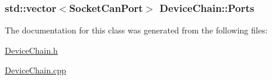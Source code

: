 \subsubsection[{\texorpdfstring{Ports}{Ports}}]{\setlength{\rightskip}{0pt plus 5cm}std\+::vector$<${\bf Socket\+Can\+Port}$>$ Device\+Chain\+::\+Ports\hspace{0.3cm}{\ttfamily [private]}}\hypertarget{classDeviceChain_a760e12bf0095431fe76563cc5d7969de}{}\label{classDeviceChain_a760e12bf0095431fe76563cc5d7969de}


The documentation for this class was generated from the following files\+:\begin{DoxyCompactItemize}
\item 
\hyperlink{DeviceChain_8h}{Device\+Chain.\+h}\item 
\hyperlink{DeviceChain_8cpp}{Device\+Chain.\+cpp}\end{DoxyCompactItemize}
